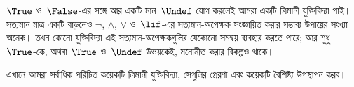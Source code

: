\documentclass[../../../include/open-logic-section]{subfiles}
\begin{document}


$\True$ ও~$\False$-এর সঙ্গে আর একটি মান~$\Undef$ যোগ করলেই আমরা একটি
ত্রিমানী যুক্তিবিদ্যা পাই। সত্যমান মাত্র একটি বাড়লেও $\lnot$,
$\land$, $\lor$ ও~$\lif$-এর সত্যমান-অপেক্ষক সংজ্ঞায়িত করার সম্ভাব্য
উপায়ের সংখ্যা অনেক। তখন কোনো যুক্তিবিদ্যা এই সত্যমান-অপেক্ষকগুলির
যেকোনো সমন্বয় ব্যবহার করতে পারে; আর শুধু~$\True$-কে, অথবা $\True$
ও~$\Undef$ উভয়কেই, মনোনীত করার বিকল্পও থাকে।

এখানে আমরা সর্বাধিক পরিচিত কয়েকটি ত্রিমানী যুক্তিবিদ্যা, সেগুলির
প্রেরণা এবং কয়েকটি বৈশিষ্ট্য উপস্থাপন করব।
\end{document}
